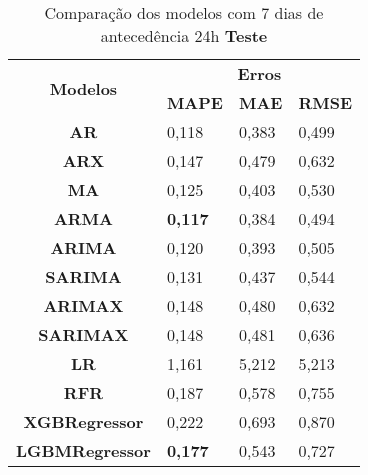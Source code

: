 \begin{table}[H]
	\centering
	\caption{Comparação dos modelos com 7 dias de antecedência 24h \textbf{Teste} }\label{tb:10-24tst}
	\begin{tabular}{@{}clll@{}}
		\toprule
		\multirow{2}{*}{\textbf{Modelos}} & \multicolumn{3}{c}{\textbf{Erros}}                                                                       \\ \cmidrule(l){2-4} 
		& \multicolumn{1}{c}{\textbf{MAPE}} & \multicolumn{1}{c}{\textbf{MAE}} & \multicolumn{1}{c}{\textbf{RMSE}} \\ \hline
\textbf{AR}                       & 0,118                             & 0,383                            & 0,499                             \\
\textbf{ARX}                      & 0,147                             & 0,479                            & 0,632                             \\
\textbf{MA}                       & 0,125                             & 0,403                            & 0,530                             \\
\textbf{ARMA}                     & \textbf{0,117}                             & 0,384                            & 0,494                             \\
\textbf{ARIMA}                    & 0,120                             & 0,393                            & 0,505                             \\
\textbf{SARIMA}                   & 0,131                             & 0,437                            & 0,544                             \\
\textbf{ARIMAX}                   & 0,148                             & 0,480                            & 0,632                             \\
\textbf{SARIMAX}                  & 0,148                             & 0,481                            & 0,636                             \\
\textbf{LR}                       & 1,161                             & 5,212                            & 5,213                             \\
\textbf{RFR}                      & 0,187                             & 0,578                            & 0,755                             \\
\textbf{XGBRegressor}             & 0,222                             & 0,693                            & 0,870                             \\
\textbf{LGBMRegressor}            & \textbf{0,177 }                            & 0,543                            & 0,727                             \\ \bottomrule
	\end{tabular}

\end{table}

